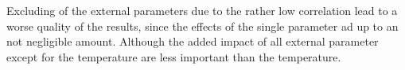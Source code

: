 \documentclass  [
  paper    = a4,
  BCOR     = 10mm,
  twoside,
  fontsize = 12pt,
  fleqn,
  toc      = bibnumbered,
  toc      = listofnumbered,
  numbers  = noendperiod,
  headings = normal,
  listof   = leveldown,
  version  = 3.03
]                                       {scrreprt}
\begin{document}
	Excluding of the external parameters due to the rather low correlation lead to a worse quality of the results, since the effects of the single parameter ad up to an 
	not negligible amount. Although the added impact of all external parameter except for the temperature are less important than the temperature.
	\begin{figure}

\end{figure}
\end{document}
